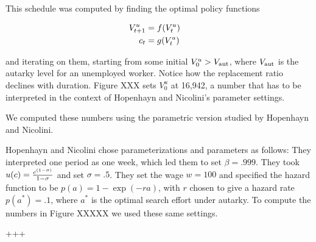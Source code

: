 
 This schedule was computed by finding the optimal policy functions

$$
\begin{align} V^u_{t+1} & = f(V^u_t) \cr
             c_t & = g(V^u_t)
\end{align}
$$

and iterating on them, starting from some initial $V^u_0 > V_{\rm aut}$,
where $V_{\rm aut}$ is the autarky level for an unemployed worker.
Notice how the replacement ratio declines with duration.
Figure XXX
sets $V^u_0$ at 16,942, a number that
has to be interpreted in the context of Hopenhayn and Nicolini's
parameter settings.

We computed these numbers using the parametric version studied by Hopenhayn
and Nicolini.


 Hopenhayn and Nicolini chose parameterizations and parameters as follows:
They interpreted one  period as one week, which led them
to set $\beta=.999$.  They took  $u(c) = {c^{(1-\sigma)} \over 1 - \sigma}$
and set
$\sigma=.5$.  They set the wage $w=100$ and
specified the hazard function to be  $p(a) = 1 - \exp(-ra)$, with $r$ chosen
to give a hazard rate $ p(a^*) = .1$, where
$a^*$ is the optimal search  effort under autarky. To compute the numbers
in Figure XXXXX we used
these same settings.

+++